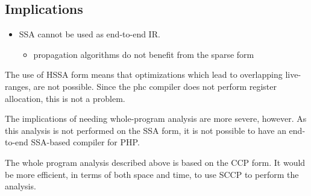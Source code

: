 \subsection{Implications}
\begin{itemize}
   \item SSA cannot be used as end-to-end IR.
	\begin{itemize}
	\item propagation algorithms do not benefit from the sparse form
	\end{itemize}
\end{itemize}


The use of HSSA form means that optimizations which lead to overlapping live-ranges, are not possible.
Since the phc compiler does not perform register allocation, this is not a problem.

The implications of needing whole-program analysis are more severe, however.
As this analysis is not performed on the SSA form, it is not possible to have an end-to-end SSA-based compiler for PHP.

The whole program analysis described above is based on the CCP form.
It would be more efficient, in terms of both space and time, to use SCCP to perform the analysis.



